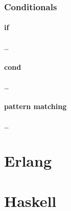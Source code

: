 \documentclass[a4paper,landscape,10pt]{article}
\begin{document}
\subsubsection{Conditionals}

\paragraph{if}

\dots

\paragraph{cond}

\dots

\paragraph{pattern matching}

\dots

\clearpage

\section{Erlang}

\clearpage

\section{Haskell}
\end{document}
